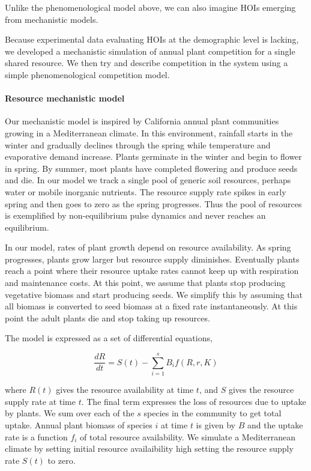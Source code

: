 \documentclass[12pt,]{article}
\let\oldparagraph\paragraph
\renewcommand{\paragraph}[1]{\oldparagraph{#1}\mbox{}}
\begin{document}
Unlike the phenomenological model above, we can also imagine HOIs
emerging from mechanistic models.

Because experimental data evaluating HOIs at the demographic level is
lacking, we developed a mechanistic simulation of annual plant
competition for a single shared resource. We then try and describe
competition in the system using a simple phenomenological competition
model.

\paragraph{Resource mechanistic model}\label{resource-mechanistic-model}

Our mechanistic model is inspired by California annual plant communities
growing in a Mediterranean climate. In this environment, rainfall starts
in the winter and gradually declines through the spring while
temperature and evaporative demand increase. Plants germinate in the
winter and begin to flower in spring. By summer, most plants have
completed flowering and produce seeds and die. In our model we track a
single pool of generic soil resources, perhaps water or mobile inorganic
nutrients. The resource supply rate spikes in early spring and then goes
to zero as the spring progresses. Thus the pool of resources is
exemplified by non-equilibrium pulse dynamics and never reaches an
equilibrium.

In our model, rates of plant growth depend on resource availability. As
spring progresses, plants grow larger but resource supply diminishes.
Eventually plants reach a point where their resource uptake rates cannot
keep up with respiration and maintenance costs. At this point, we assume
that plants stop producing vegetative biomass and start producing seeds.
We simplify this by assuming that all biomass is converted to seed
biomass at a fixed rate instantaneously. At this point the adult plants
die and stop taking up resources.

The model is expressed as a set of differential equations,

\vspace{-1em}

\begin{equation} \label{eq4}
\frac{dR}{dt} = S(t) - \sum_{i = 1}^sB_{i}f(R,r, K)
\end{equation}

where \(R(t)\) gives the resource availability at time \(t\), and \(S\)
gives the resource supply rate at time \(t\). The final term expresses
the loss of resources due to uptake by plants. We sum over each of the
\(s\) species in the community to get total uptake. Annual plant biomass
of species \(i\) at time \(t\) is given by \(B\) and the uptake rate is
a function \(f_i\) of total resource availability. We simulate a
Mediterranean climate by setting initial resource availaibility high
setting the resource supply rate \(S(t)\) to zero.
\end{document}
